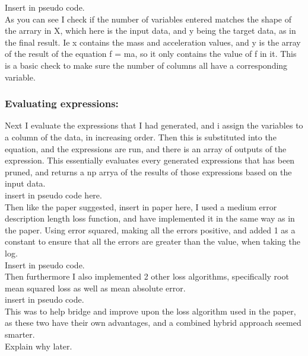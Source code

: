 \documentclass{article}
\begin{document}
Insert in pseudo code.\\

As you can see I check if the number of variables entered matches the shape of the arrary in X, which here is the input data, and y being the target data, as in the final result. Ie x contains the mass and acceleration values, and y is the array of the result of the equation f = ma, so it only contains the value of f in it. This is a basic check to make sure the number of columns all have a corresponding variable.\\ 

\subsubsection{ Evaluating expressions: }

Next I evaluate the expressions that I had generated, and i assign the variables to a column of the data, in increasing order. Then this is substituted into the equation, and the expressions are run, and there is an array of outputs of the expression. This essentially evaluates every generated expressions that has been pruned, and returns a np arrya of the results of those expressions based on the input data.\\ 

insert in pseudo code here.\\

Then like the paper suggested, insert in paper here, I used a medium error description length loss function, and have implemented it in the same way as in the paper. Using error squared, making all the errors positive, and added 1 as a constant to ensure that all the errors are greater than the value, when taking the log. \\

Insert in pseudo code. \\

Then furthermore I also implemented 2 other loss algorithms, specifically root mean squared loss as well as mean absolute error.\\

insert in pseudo code.\\

This was to help bridge and improve upon the loss algorithm used in the paper, as these two have their own advantages, and a combined hybrid approach seemed smarter.\\ 
Explain why later.\\
\end{document}
